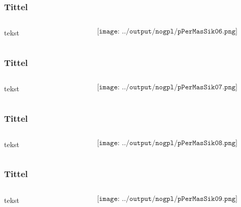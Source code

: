 \documentclass[aspectratio=169,xcolor=dvipsnames]{beamer}
\begin{document}
\begin{frame}
	\frametitle{Tittel}
	\begin{columns}
		\begin{column}{0.5\textwidth}
tekst
			
		\end{column}

		\begin{column}{0.5\textwidth}
	$$\texttt{[image: ../output/nogpl/pPerMasSik06.png]}$$
		\end{column}
	\end{columns}
\end{frame}

\begin{frame}
	\frametitle{Tittel}
	\begin{columns}
		\begin{column}{0.5\textwidth}
tekst
			
		\end{column}

		\begin{column}{0.5\textwidth}
	$$\texttt{[image: ../output/nogpl/pPerMasSik07.png]}$$
		\end{column}
	\end{columns}
\end{frame}

\begin{frame}
	\frametitle{Tittel}
	\begin{columns}
		\begin{column}{0.5\textwidth}
tekst
			
		\end{column}

		\begin{column}{0.5\textwidth}
	$$\texttt{[image: ../output/nogpl/pPerMasSik08.png]}$$
		\end{column}
	\end{columns}
\end{frame}

\begin{frame}
	\frametitle{Tittel}
	\begin{columns}
		\begin{column}{0.5\textwidth}
tekst
			
		\end{column}

		\begin{column}{0.5\textwidth}
	$$\texttt{[image: ../output/nogpl/pPerMasSik09.png]}$$
		\end{column}
	\end{columns}
\end{frame}
\end{document}
